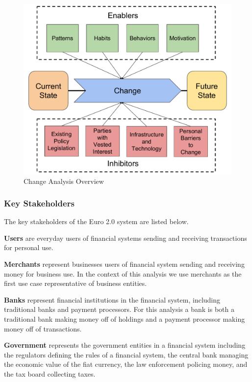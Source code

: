 \documentclass[a4paper,12pt]{article} %
\begin{document}
{\begin{figure}[ht]
    \centering
    \includegraphics[width=\textwidth]{change-analysis}
    \caption{Change Analysis Overview}
    \label{fig:changeAnalysis}
\end{figure}

\subsubsection{Key Stakeholders} \label{sssec:4.2:keyStakeholders}

The key stakeholders of the Euro 2.0 system are listed below.

\textbf{Users} are everyday users of financial systems sending and receiving transactions for personal use.

\textbf{Merchants} represent businesses users of financial system sending and receiving money for business use. In the context of this analysis we use merchants as the first use case representative of business entities.

\textbf{Banks} represent financial institutions in the financial system, including traditional banks and payment processors. For this analysis a bank is both a traditional bank making money off of holdings and a payment processor making money off of transactions.

\textbf{Government} represents the government entities in a financial system including the regulators defining the rules of a financial system, the central bank managing the economic value of the fiat currency, the law enforcement policing money, and the tax board collecting taxes.

}
\end{document}
